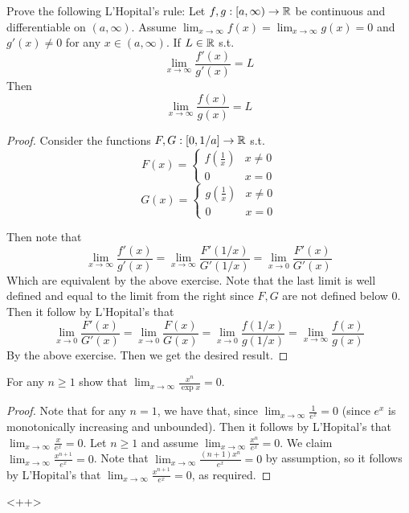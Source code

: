 \begin{exercise}
  Prove the following L'Hopital's rule: Let $f,g:[a,\infty)\to\mathbb R$ be continuous and
  differentiable on $(a,\infty)$. Assume $\lim_{x\to\infty}f(x)=\lim_{x\to\infty}g(x)=0$
  and $g'(x)\neq 0$ for any $x\in(a,\infty)$. If $L\in\mathbb R$ s.t. 
  \[\lim_{x\to \infty} \frac{f'(x)}{g'(x)}=L\]
  Then
  \[\lim_{x\to \infty} \frac{f(x)}{g(x)}=L\]
\end{exercise}
\begin{proof}
  Consider the functions $F,G:[0,1/a]\to\mathbb R$ s.t. 
  \[F(x)= \begin{cases}
      f(\frac{1}{x}) & x\neq 0\\
      0 & x=0
  \end{cases}\]
  \[G(x)= \begin{cases}
      g(\frac{1}{x}) & x\neq 0\\
      0 & x=0
  \end{cases}\]

  Then note that 
  \[\lim_{x\to\infty} \frac{f'(x)}{g'(x)} = \lim_{x\to\infty} \frac{F'(1/x)}{G'(1/x)} =
  \lim_{x\to 0} \frac{F'(x)}{G'(x)}\]
  Which are equivalent by the above exercise. Note that the last limit is well defined and
  equal to the limit from the right since $F,G$ are not defined below $0$. Then it follow
  by L'Hopital's that 
  \[\lim_{x\to 0} \frac{F'(x)}{G'(x)} = \lim_{x\to 0} \frac{F(x)}{G(x)} = \lim_{x\to 0}
  \frac{f(1/x)}{g(1/x)} = \lim_{x\to\infty} \frac{f(x)}{g(x)}\]
  By the above exercise. Then we get the desired result.
\end{proof}

\begin{exercise}
  For any $n\geq 1$ show that $\lim_{x\to\infty}\frac{x^n}{\exp x}=0$.
\end{exercise}
\begin{proof}
  Note that for any $n=1$, we have that, since $\lim_{x\to \infty} \frac{1}{e^x}=0$ (since
  $e^x$ is monotonically increasing and unbounded). Then it follows by L'Hopital's that
  $\lim_{x\to\infty} \frac{x}{e^x}=0$. Let $n\geq 1$ and assume
  $\lim_{x\to\infty}\frac{x^n}{e^x}=0$. We claim $\lim_{x\to\infty}\frac{x^{n+1}}{e^x}
  =0$. Note that $\lim_{x\to\infty} \frac{(n+1)x^n}{e^x}= 0$ by assumption, so it follows
  by L'Hopital's that $\lim_{x\to\infty}\frac{x^{n+1}}{e^x}=0$, as required.
\end{proof}<++>
